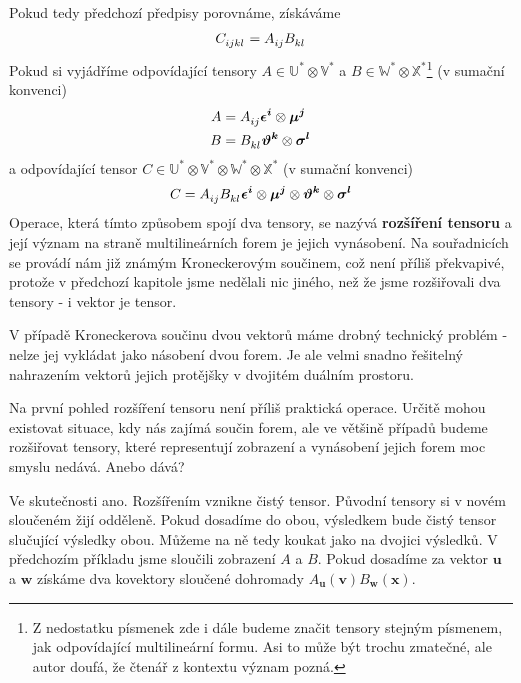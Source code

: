 \documentclass[a5paper,12pt]{amsbook}
\theoremstyle{definition}
\newcommand{\myvec}[1]{\bm{#1}}
\newcommand{\myspace}[1]{\mathbb{#1}}
\begin{document}
Pokud tedy předchozí předpisy porovnáme, získáváme
\begin{equation*}
\begin{split}
C\indices{_i_j_k_l} = A\indices{_i_j} B\indices{_k_l}
\end{split}
\end{equation*}
Pokud si vyjádříme odpovídající tensory $A\in\myspace{U^*}\otimes\myspace{V^*}$
a $B\in\myspace{W^*}\otimes\myspace{X^*}$\footnote{
	Z nedostatku písmenek zde i dále budeme značit tensory stejným písmenem,
	jak odpovídající multilineární formu. Asi to může být trochu zmatečné,
	ale autor doufá, že čtenář z kontextu význam pozná.
} (v sumační konvenci)
\begin{equation*}
\begin{split}
A &= A\indices{_i_j} \myvec{\epsilon^i}\otimes\myvec{\mu^j} \\
B &= B\indices{_k_l} \myvec{\vartheta^k}\otimes\myvec{\sigma^l}
\end{split}
\end{equation*}
a odpovídající tensor $C\in\myspace{U^*}\otimes\myspace{V^*}\otimes\myspace{W^*}\otimes\myspace{X^*}$
(v sumační konvenci)
\begin{equation*}
\begin{split}
C = A\indices{_i_j} B\indices{_k_l}
\myvec{\epsilon^i}\otimes\myvec{\mu^j}\otimes\myvec{\vartheta^k}\otimes\myvec{\sigma^l}
\end{split}
\end{equation*}
Operace, která tímto způsobem spojí dva tensory, se nazývá \textbf{rozšíření tensoru}
a její význam na straně multilineárních forem je jejich vynásobení. Na souřadnicích
se provádí nám již známým Kroneckerovým součinem, což není příliš překvapivé, protože
v předchozí kapitole jsme nedělali nic jiného, než že jsme rozšiřovali dva tensory -
i vektor je tensor.

V případě Kroneckerova součinu dvou vektorů máme drobný technický problém - nelze
jej vykládat jako násobení dvou forem. Je ale velmi snadno řešitelný nahrazením
vektorů jejich protějšky v dvojitém duálním prostoru.

Na první pohled rozšíření tensoru není příliš praktická operace. Určitě mohou existovat
situace, kdy nás zajímá součin forem, ale ve většině případů budeme rozšiřovat tensory,
které representují zobrazení a vynásobení jejich forem moc smyslu nedává. Anebo dává?

Ve skutečnosti ano. Rozšířením vznikne čistý tensor. Původní tensory si v novém
sloučeném žijí odděleně. Pokud dosadíme do obou, výsledkem bude čistý tensor slučující
výsledky obou. Můžeme na ně tedy koukat jako na dvojici výsledků. V předchozím
příkladu jsme sloučili zobrazení $A$ a $B$. Pokud dosadíme za vektor $\myvec{u}$
a $\myvec{w}$ získáme dva kovektory sloučené dohromady
$A_{\myvec{u}}(\myvec{v})B_{\myvec{w}}(\myvec{x})$.
\end{document}
